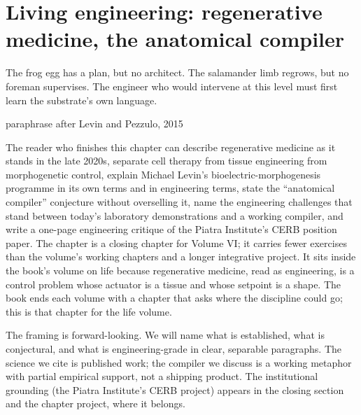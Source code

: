 \chapter{Living engineering: regenerative medicine, the anatomical compiler}
\label{vol06:ch13}

\epigraph{The frog egg has a plan, but no architect. The salamander limb
regrows, but no foreman supervises. The engineer who would intervene at
this level must first learn the substrate's own language.}{paraphrase
after Levin and Pezzulo, 2015}


\noindent
The reader who finishes this chapter can describe regenerative medicine
as it stands in the late 2020s, separate cell therapy from tissue
engineering from morphogenetic control, explain Michael Levin's
bioelectric-morphogenesis programme in its own terms and in engineering
terms, state the ``anatomical compiler'' conjecture without overselling
it, name the engineering challenges that stand between today's
laboratory demonstrations and a working compiler, and write a one-page
engineering critique of the Piatra Institute's CERB position paper. The
chapter is a closing chapter for Volume VI; it carries fewer exercises
than the volume's working chapters and a longer integrative project. It
sits inside the book's volume on life because regenerative medicine,
read as engineering, is a control problem whose actuator is a tissue
and whose setpoint is a shape. The book ends each volume with a chapter
that asks where the discipline could go; this is that chapter for the
life volume.

The framing is forward-looking. We will name what is established, what
is conjectural, and what is engineering-grade in clear, separable
paragraphs. The science we cite is published work; the compiler we
discuss is a working metaphor with partial empirical support, not a
shipping product. The institutional grounding (the Piatra Institute's
CERB project) appears in the closing section and the chapter project,
where it belongs.

